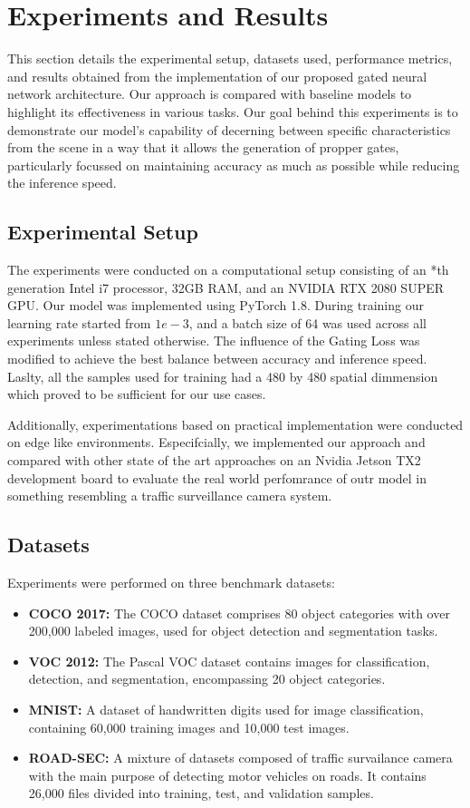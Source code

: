 \section{Experiments and Results}  

This section details the experimental setup, datasets used, performance metrics, and results obtained from the implementation of our proposed gated neural network architecture. Our approach is compared with baseline models to highlight its effectiveness in various tasks. Our goal behind this experiments is to demonstrate our model's capability of decerning between specific characteristics from the scene in a way that it allows the generation of propper gates, particularly focussed on maintaining accuracy as much as possible while reducing the inference speed.

\subsection{Experimental Setup}

The experiments were conducted on a computational setup consisting of an *th generation Intel i7 processor, 32GB RAM, and an NVIDIA RTX 2080 SUPER GPU. Our model was implemented using PyTorch 1.8. During training our learning rate started from $1e-3$, and a batch size of 64 was used across all experiments unless stated otherwise. The influence of the Gating Loss was modified to achieve the best balance between accuracy and inference speed. Laslty, all the samples used for training had a 480 by 480 spatial dimmension which proved to be sufficient for our use cases.

Additionally, experimentations based on practical implementation were conducted on edge like environments. Especifcially, we implemented our approach and compared with other state of the art approaches on an Nvidia Jetson TX2 development board to evaluate the real world perfomrance of outr model in something resembling a traffic surveillance camera system.

\subsection{Datasets}

Experiments were performed on three benchmark datasets:
\begin{itemize}
    \item \textbf{COCO 2017:} The COCO dataset comprises 80 object categories with over 200,000 labeled images, used for object detection and segmentation tasks.
    \item \textbf{VOC 2012:} The Pascal VOC dataset contains images for classification, detection, and segmentation, encompassing 20 object categories.
    \item \textbf{MNIST:} A dataset of handwritten digits used for image classification, containing 60,000 training images and 10,000 test images.
    \item \textbf{ROAD-SEC:} A mixture of datasets composed of traffic survailance camera with the main purpose of detecting motor vehicles on roads. It contains 26,000 files divided into training, test, and validation samples.
\end{itemize}

